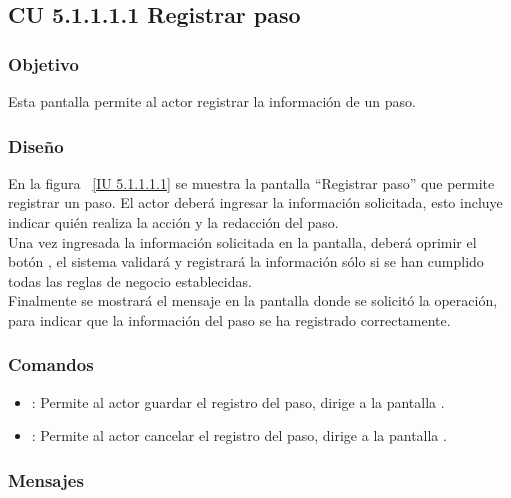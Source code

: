 \subsection{CU 5.1.1.1.1 Registrar paso}

\subsubsection{Objetivo}
	
	Esta pantalla permite al actor registrar la información de un paso.

\subsubsection{Diseño}

    En la figura ~\ref{IU 5.1.1.1.1} se muestra la pantalla ``Registrar paso'' que permite registrar un paso. El actor deberá ingresar la información solicitada, 
    esto incluye indicar quién realiza la acción y la redacción del paso.\\
    
    
    Una vez ingresada la información solicitada en la pantalla, deberá oprimir el botón 
    , el sistema validará y registrará la información sólo si se han cumplido todas las reglas de negocio establecidas.  \\
    
    Finalmente se mostrará el mensaje  en la pantalla donde se solicitó la operación,
    para indicar que la información del paso
    se ha registrado correctamente.        




\subsubsection{Comandos}
\begin{itemize}
	\item {}: Permite al actor guardar el registro del paso, dirige a la pantalla .
	\item {}: Permite al actor cancelar el registro del paso, dirige a la pantalla .
\end{itemize}

\subsubsection{Mensajes}

